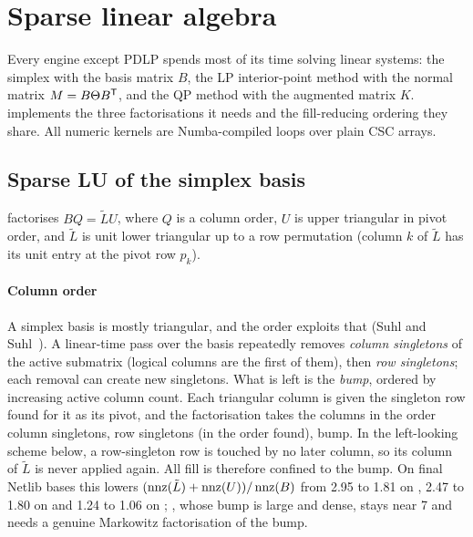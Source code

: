 \section{Sparse linear algebra}\label{sec:linalg}

Every engine except PDLP spends most of its time solving linear systems: the simplex with the basis
matrix $B$, the LP interior-point method with the normal matrix $M=B\Theta B^{\mathsf{T}}$, and the QP method with
the augmented matrix $K$. \nirnay{} implements the three factorisations it needs and the
fill-reducing ordering they share. All numeric kernels are Numba-compiled loops over plain CSC
arrays.

\subsection{Sparse LU of the simplex basis}\label{sec:lu}
 factorises $BQ=\tilde L U$, where $Q$ is a column order, $U$ is upper
triangular in pivot order, and $\tilde L$ is unit lower triangular up to a row permutation (column
$k$ of $\tilde L$ has its unit entry at the pivot row $p_k$).

\paragraph{Column order}
A simplex basis is mostly triangular, and the order exploits that (Suhl and Suhl~\cite{suhl1990}).
A linear-time pass over the basis repeatedly removes \emph{column singletons} of the active
submatrix (logical columns are the first of them), then \emph{row singletons}; each removal can
create new singletons. What is left is the \emph{bump}, ordered by increasing active column count.
Each triangular column is given the singleton row found for it as its pivot, and the factorisation
takes the columns in the order column singletons, row singletons (in the order found), bump. In
the left-looking scheme below, a row-singleton row is touched by no later column, so its column of
$\tilde L$ is never applied again. All fill is therefore confined to the bump. On final Netlib bases
this lowers $(\operatorname{nnz}(\tilde L)+\operatorname{nnz}(U))/\operatorname{nnz}(B)$ from 2.95 to 1.81 on , 2.47 to 1.80 on
 and 1.24 to 1.06 on ; , whose bump is large and dense, stays
near 7 and needs a genuine Markowitz factorisation of the bump.

